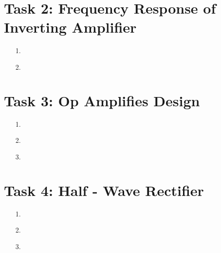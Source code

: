 \documentclass[11pt,a4paper]{article}
\begin{document}
\section*{Task 2: Frequency Response of Inverting Amplifier}

\begin{enumerate}
  \item[1.]
  
  \item[2.]
  
\end{enumerate}

\section*{Task 3: Op Amplifies Design}

\begin{enumerate}
  \item[1.]
  
  \item[2.]
  
  \item[3.]
  
\end{enumerate}

\section*{Task 4: Half - Wave Rectifier}

\begin{enumerate}
  \item[1.]
  
  \item[2.]
  
  \item[3.]
  
\end{enumerate}
\end{document}
